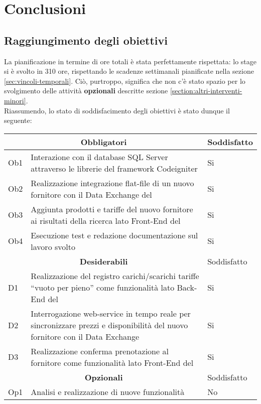 
\chapter{Conclusioni}
\label{cap:conclusioni}

\section{Raggiungimento degli obiettivi}
La pianificazione in termine di ore totali è stata perfettamente rispettata: lo stage si è svolto in 310 ore, rispettando le scadenze settimanali pianificate nella sezione \ref{sec:vincoli-temporali}. Ciò, purtroppo, significa che non c'è stato spazio per lo svolgimento delle attività \textbf{opzionali} descritte sezione \ref{section:altri-interventi-minori}.\\Riassumendo, lo stato di soddisfacimento degli obiettivi è stato dunque il seguente:
\begin{center}
	\def\arraystretch{1.5}
	\begin{longtable}{p{1.5cm} p{8.5cm} p{1.5cm} } 
		\hline
		\multicolumn{2}{c}{\textbf{Obbligatori}} & Soddisfatto\\
		\hline
		Ob1 & Interazione con il database SQL Server attraverso le librerie del framework Codeigniter & Si\\
		\hline
		Ob2 & Realizzazione integrazione flat-file di un nuovo fornitore con il Data Exchange del \bookingEngine & Si\\
		\hline
		Ob3 & Aggiunta prodotti e tariffe del nuovo fornitore ai risultati della ricerca lato Front-End del \bookingEngine & Si\\
		\hline
		Ob4 & Esecuzione test e redazione documentazione sul lavoro svolto & Si\\
		\hline
		\multicolumn{2}{c}{\textbf{Desiderabili}} & Soddisfatto\\
		\hline
		D1 & Realizzazione del registro carichi/scarichi tariffe “vuoto per pieno” come	funzionalità lato Back-End del \bookingEngine & Si\\
		\hline
		D2 & Interrogazione web-service in tempo reale per sincronizzare prezzi e disponibilità del nuovo fornitore con il Data Exchange & Si\\
		\hline
		D3 & Realizzazione conferma prenotazione al fornitore come funzionalità lato Front-End del \bookingEngine & Si\\
		\hline
		\multicolumn{2}{c}{\textbf{Opzionali}} & Soddisfatto\\
		\hline
		Op1 & Analisi e realizzazione di nuove funzionalità & No\\
		\hline
	\end{longtable}
\end{center}
